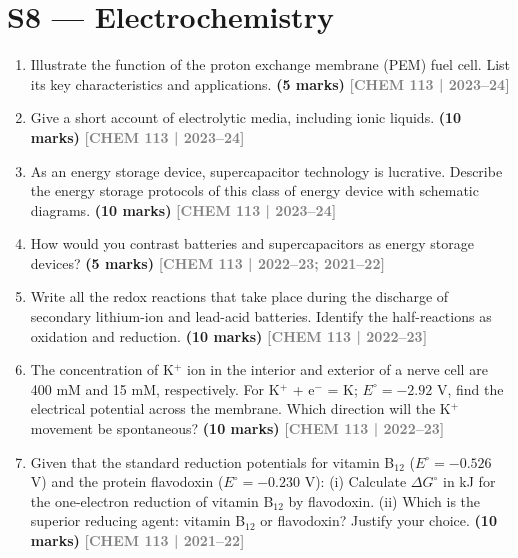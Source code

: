 \documentclass[12pt,a3paper]{article}
\newcommand{\yr}[1]{\hfill\textcolor{gray}{\small\textbf{[#1]}}}
\newcommand{\mk}[1]{\textcolor{orange!70!black}{\small\textbf{(#1 marks)}}}
\begin{document}
\section{S8 --- Electrochemistry}

\begin{enumerate}
\item Illustrate the function of the proton exchange membrane (PEM) fuel cell. List its key characteristics and applications. \mk{5}
\yr{CHEM 113 | 2023--24}



\item Give a short account of electrolytic media, including ionic liquids. \mk{10}
\yr{CHEM 113 | 2023--24}



\item As an energy storage device, supercapacitor technology is lucrative. Describe the energy storage protocols of this class of energy device with schematic diagrams. \mk{10}
\yr{CHEM 113 | 2023--24}




\item How would you contrast batteries and supercapacitors as energy storage devices? \mk{5}
\yr{CHEM 113 | 2022--23; 2021--22}



\item Write all the redox reactions that take place during the discharge of secondary lithium-ion and lead-acid batteries. Identify the half-reactions as oxidation and reduction. \mk{10}
\yr{CHEM 113 | 2022--23}



\item The concentration of K$^+$ ion in the interior and exterior of a nerve cell are 400 mM and 15 mM, respectively. For K$^+$ + e$^-$ = K; $E^\circ = -2.92$ V, find the electrical potential across the membrane. Which direction will the K$^+$ movement be spontaneous? \mk{10}
\yr{CHEM 113 | 2022--23}



\item Given that the standard reduction potentials for vitamin B$_{12}$ ($E^\circ = -0.526$ V) and the protein flavodoxin ($E^\circ = -0.230$ V): (i) Calculate $\Delta G^\circ$ in kJ for the one-electron reduction of vitamin B$_{12}$ by flavodoxin. (ii) Which is the superior reducing agent: vitamin B$_{12}$ or flavodoxin? Justify your choice. \mk{10}
\yr{CHEM 113 | 2021--22}




\end{enumerate}
\end{document}
